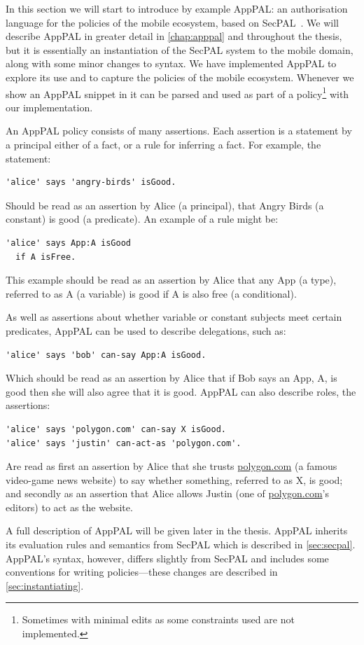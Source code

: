 \documentclass[thesis.tex]{subfiles}
\begin{document}
In this section we will start to introduce by example AppPAL: an authorisation
language for the policies of the mobile ecosystem, based on
SecPAL~\cite{becker_secpal:_2006}. We will describe AppPAL in greater detail in
\autoref{chap:apppal} and throughout the thesis, but it is essentially an
instantiation of the SecPAL system to the mobile domain, along with some minor
changes to syntax. We have implemented AppPAL to explore its use and to capture
the policies of the mobile ecosystem. Whenever we show an AppPAL snippet in
 it can be parsed and used as part of a
policy\footnote{Sometimes with minimal edits as some constraints used are not
implemented.} with our implementation.

An AppPAL policy consists of many assertions.  Each assertion is a statement by
a principal either of a fact, or a rule for inferring a fact.  For example, the statement:
\begin{lstlisting}
'alice' says 'angry-birds' isGood.
\end{lstlisting}
Should be read as an assertion by Alice (a principal), that Angry Birds (a
constant) is good (a predicate).  An example of a rule might be:
\begin{lstlisting}
'alice' says App:A isGood 
  if A isFree.
\end{lstlisting}
This example should be read as an assertion by Alice that any App (a type),
referred to as A (a variable) is good if A is also free (a conditional).   

As well as assertions about whether variable or constant subjects meet certain
predicates, AppPAL can be used to describe delegations, such as:
\begin{lstlisting}
'alice' says 'bob' can-say App:A isGood.
\end{lstlisting}
Which should be read as an assertion by Alice that if Bob says an App, A, is
good then she will also agree that it is good.  AppPAL can also describe roles,
the assertions:
\begin{lstlisting}
'alice' says 'polygon.com' can-say X isGood.
'alice' says 'justin' can-act-as 'polygon.com'.
\end{lstlisting}
Are read as first an assertion by Alice that she trusts \url{polygon.com} (a
famous video-game news website) to say whether something, referred to as X, is
good; and secondly as an assertion that Alice allows Justin (one of
\url{polygon.com}'s editors) to act as the website.  

A full description of AppPAL will be given later in the thesis.  
AppPAL inherits its evaluation rules and semantics from SecPAL which is described in
\autoref{sec:secpal}.  AppPAL's syntax, however, differs slightly
from SecPAL and includes some conventions for writing policies---these changes
are described in \autoref{sec:instantiating}.
\end{document}
